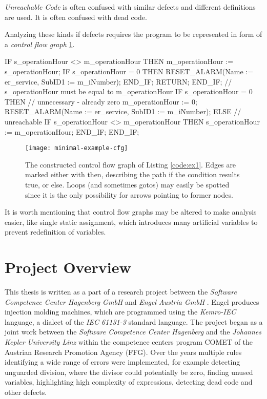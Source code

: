 \emph{Unreachable Code} is often confused with similar defects and different definitions are used.
It is often confused with dead code.

Analyzing these kinds if defects requires the program to be represented in form of a \emph{control flow graph} \ref{fig:cfg}.


\begin{program}
    \begin{GenericCode}
IF s_operationHour <> m_operationHour THEN
    m_operationHour := s_operationHour;
    IF s_operationHour = 0 THEN
        RESET_ALARM(Name := er_service, SubID1 := m_iNumber);
    END_IF;
    RETURN;
END_IF;
// s_operationHour must be equal to m_operationHour
IF s_operationHour = 0 THEN
    // unnecessary - already zero
    m_operationHour := 0;
    RESET_ALARM(Name := er_service, SubID1 := m_iNumber);
ELSE
    // unreachable
    IF s_operationHour <> m_operationHour THEN
        s_operationHour := m_operationHour;
    END_IF;
END_IF;\end{GenericCode}
    \caption{A minimal example containing unreachable code due to unsatisfiable conditions. The condition in line 15 is never reachable, since this case was already handeld in line 1 and the state of that variable did not change.}
    \label{code:ex1}
\end{program}
\begin{figure}
  \centering
  \texttt{[image: minimal-example-cfg]}
  \caption{The constructed control flow graph of Listing \ref{code:ex1}. Edges are marked either with then, describing the path if the condition results true, or else. Loops (and sometimes gotos) may easily be spotted since it is the only possibility for arrows pointing to former nodes.}
  \label{fig:cfg}
\end{figure}

It is worth mentioning that control flow graphs may be altered to make analysis easier, like single static assignment, which introduces many artificial variables to prevent redefinition of variables.

\section{Project Overview}
\label{sec:project overview}
This thesis is written as a part of a research project between the \emph{Software Competence Center Hagenberg GmbH} \cite{ScchGmbH} and \emph{Engel Austria GmbH} \cite{EngelGmbH}.
Engel produces injection molding machines, which are programmed using the \emph{Kemro-IEC} language, a dialect of the \emph{IEC 61131-3} standard language.
The project began as a joint work between the \emph{Software Competence Center Hagenberg} and the \emph{Johannes Kepler University Linz} \cite{jku, Prahofer_2012} within the competence centers program COMET of the Austrian Research Promotion Agency (FFG).
Over the years multiple rules identifying a wide range of errors were implemented, for example detecting unguarded division, where the divisor could potentially be zero, finding unused variables, highlighting high complexity of expressions, detecting dead code and other defects.

